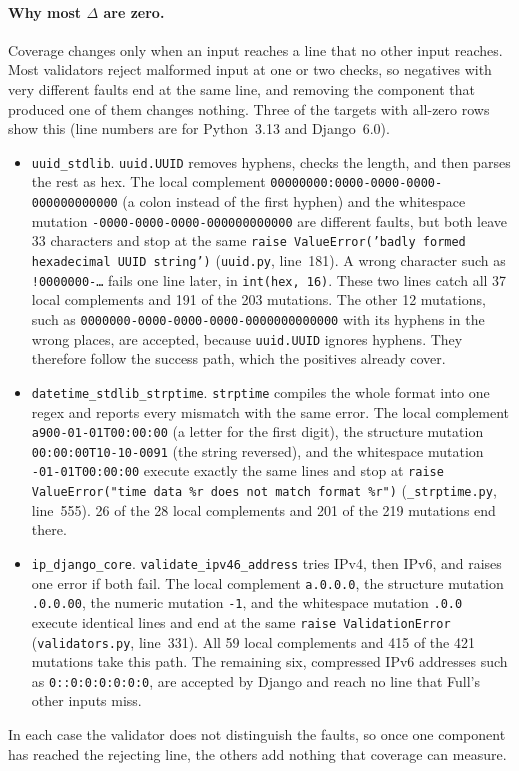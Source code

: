 \paragraph{Why most $\Delta$ are zero.}
Coverage changes only when an input reaches a line that no other input reaches.
Most validators reject malformed input at one or two checks, so negatives with
very different faults end at the same line, and removing the component that
produced one of them changes nothing. Three of the targets with all-zero rows
show this (line numbers are for Python~3.13 and Django~6.0).
\begin{itemize}
  \item \texttt{uuid\_stdlib}. \texttt{uuid.UUID} removes hyphens, checks the
    length, and then parses the rest as hex. The local complement
    \texttt{00000000:0000-0000-0000-000000000000} (a colon instead of the first
    hyphen) and the whitespace mutation
    \texttt{-0000-0000-0000-000000000000} are different
    faults, but both leave 33 characters and stop at the same
    \texttt{raise ValueError('badly formed hexadecimal UUID string')}
    (\texttt{uuid.py}, line~181). A wrong character such as
    \texttt{!0000000-\ldots} fails one line later, in \texttt{int(hex, 16)}. These two
    lines catch all 37 local complements and 191 of the 203 mutations. The other
    12 mutations, such as \texttt{0000000-0000-0000-0000-0000000000000} with its
    hyphens in the wrong places, are accepted, because \texttt{uuid.UUID} ignores
    hyphens. They therefore follow the success path, which the positives already
    cover.
  \item \texttt{datetime\_stdlib\_strptime}. \texttt{strptime} compiles the whole
    format into one regex and reports every mismatch with the same error. The
    local complement \texttt{a900-01-01T00:00:00} (a letter for the first digit),
    the structure mutation \texttt{00:00:00T10-10-0091} (the string reversed), and
    the whitespace mutation \texttt{-01-01T00:00:00} execute
    exactly the same lines and stop at
    \texttt{raise ValueError("time data \%r does not match format \%r")}
    (\texttt{\_strptime.py}, line~555). 26 of the 28 local complements and 201 of
    the 219 mutations end there.
  \item \texttt{ip\_django\_core}. \texttt{validate\_ipv46\_address} tries IPv4,
    then IPv6, and raises one error if both fail. The local complement
    \texttt{a.0.0.0}, the structure mutation \texttt{.0.0.00}, the numeric mutation
    \texttt{-1}, and the whitespace mutation \texttt{.0.0}
    execute identical lines and end at the same \texttt{raise ValidationError}
    (\texttt{validators.py}, line~331). All 59 local complements and 415 of the 421
    mutations take this path. The remaining six, compressed IPv6 addresses such as
    \texttt{0::0:0:0:0:0:0}, are accepted by Django and reach no line that Full's
    other inputs miss.
\end{itemize}
In each case the validator does not distinguish the faults, so once one
component has reached the rejecting line, the others add nothing that coverage
can measure.

